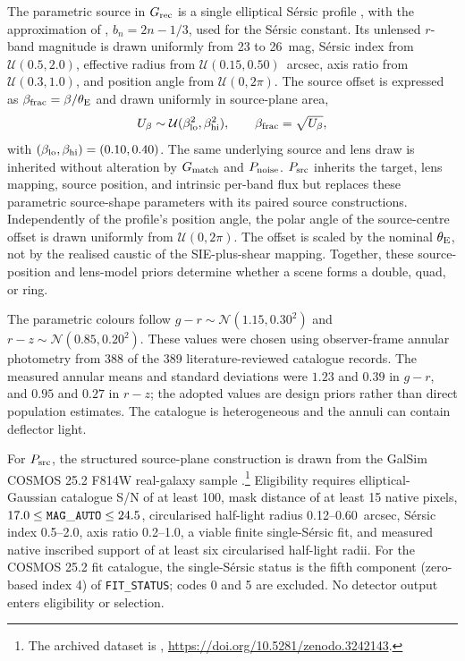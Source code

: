 The parametric source in $G_{\rm rec}$ is a single elliptical S\'{e}rsic
profile \citep{Sersic1968}, with the approximation of
\citet{CiottiBertin1999}, \(b_n=2n-1/3\), used for the S\'{e}rsic constant.
Its unlensed
$r$-band magnitude is drawn uniformly from 23 to 26~mag, S\'{e}rsic index
from $\mathcal{U}(0.5,2.0)$, effective radius from
$\mathcal{U}(0.15,0.50)$~arcsec, axis ratio from
$\mathcal{U}(0.3,1.0)$, and position angle from
$\mathcal{U}(0,2\pi)$. The source offset is expressed as
$\beta_{\rm frac}=\beta/\theta_{\rm E}$ and drawn uniformly in source-plane
area,
\begin{equation}
U_\beta\sim\mathcal{U}(\beta_{\rm lo}^{2},\beta_{\rm hi}^{2}),
\qquad
\beta_{\rm frac}=\sqrt{U_\beta},
\end{equation}
with \((\beta_{\rm lo},\beta_{\rm hi})=(0.10,0.40)\). The same underlying
source and lens draw is inherited without alteration by \(G_{\rm match}\) and
\(P_{\rm noise}\).
\(P_{\rm src}\) inherits the target, lens mapping, source position, and
intrinsic per-band flux but replaces these parametric source-shape
parameters with its paired source constructions.
Independently of the profile's position angle, the polar angle of the
source-centre offset is drawn uniformly from
$\mathcal{U}(0,2\pi)$.
The offset is scaled by the nominal \(\theta_{\rm E}\), not by the realised
caustic of the SIE-plus-shear mapping. Together, these source-position and
lens-model priors determine whether a scene forms a double, quad, or ring.

The parametric colours follow
\(g-r\sim\mathcal{N}(1.15,0.30^2)\) and
\(r-z\sim\mathcal{N}(0.85,0.20^2)\). These values were chosen using
observer-frame annular photometry from 388 of the 389 literature-reviewed
catalogue records. The measured annular means and standard deviations
were $1.23$ and $0.39$ in $g-r$, and $0.95$ and $0.27$ in $r-z$;
the adopted values are design priors rather than direct population estimates.
The catalogue is heterogeneous and the annuli can contain deflector light.

For \(P_{\rm src}\), the structured source-plane construction is drawn from
the GalSim COSMOS 25.2 F814W real-galaxy sample
\citep{Scoville2007,Koekemoer2007,Mandelbaum2012,Rowe2015}.\footnote{The
archived dataset is \citet{Mandelbaum2012},
\url{https://doi.org/10.5281/zenodo.3242143}.} Eligibility requires
elliptical-Gaussian catalogue S/N of at least 100, mask distance of at least
15 native pixels, \(17.0\leq{\tt MAG\_AUTO}\leq24.5\), circularised
half-light radius 0.12--0.60~arcsec, S\'{e}rsic index 0.5--2.0, axis ratio
0.2--1.0, a viable finite single-S\'{e}rsic fit, and measured native inscribed
support of at least six circularised half-light radii. For the COSMOS 25.2
fit catalogue, the single-S\'{e}rsic status is the fifth component
(zero-based index 4) of \texttt{FIT\_STATUS}; codes 0 and 5 are excluded.
No detector output enters eligibility or selection.

